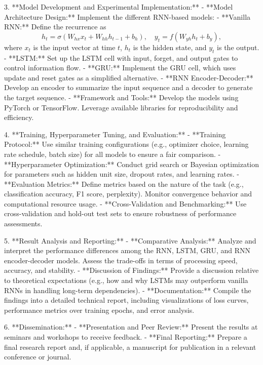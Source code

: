 \documentclass[12pt,a4paper]{article}
\begin{document}
3. **Model Development and Experimental Implementation:**
   - **Model Architecture Design:**  
     Implement the different RNN-based models:
     - **Vanilla RNN:**  
       Define the recurrence as  
       \[
       h_t = \sigma(W_{hx} x_t + W_{hh} h_{t-1} + b_h), \quad y_t = f(W_{yh} h_t + b_y),
       \]
       where \(x_t\) is the input vector at time \(t\), \(h_t\) is the hidden state, and \(y_t\) is the output.
     - **LSTM:**  
       Set up the LSTM cell with input, forget, and output gates to control information flow.
     - **GRU:**  
       Implement the GRU cell, which uses update and reset gates as a simplified alternative.
     - **RNN Encoder-Decoder:**  
       Develop an encoder to summarize the input sequence and a decoder to generate the target sequence.
   - **Framework and Tools:**  
     Develop the models using PyTorch or TensorFlow. Leverage available libraries for reproducibility and efficiency.

4. **Training, Hyperparameter Tuning, and Evaluation:**
   - **Training Protocol:**  
     Use similar training configurations (e.g., optimizer choice, learning rate schedule, batch size) for all models to ensure a fair comparison.
   - **Hyperparameter Optimization:**  
     Conduct grid search or Bayesian optimization for parameters such as hidden unit size, dropout rates, and learning rates.
   - **Evaluation Metrics:**  
     Define metrics based on the nature of the task (e.g., classification accuracy, F1 score, perplexity). Monitor convergence behavior and computational resource usage.
   - **Cross-Validation and Benchmarking:**  
     Use cross-validation and hold-out test sets to ensure robustness of performance assessments.

5. **Result Analysis and Reporting:**
   - **Comparative Analysis:**  
     Analyze and interpret the performance differences among the RNN, LSTM, GRU, and RNN encoder-decoder models. Assess the trade-offs in terms of processing speed, accuracy, and stability.
   - **Discussion of Findings:**  
     Provide a discussion relative to theoretical expectations (e.g., how and why LSTMs may outperform vanilla RNNs in handling long-term dependencies).
   - **Documentation:**  
     Compile the findings into a detailed technical report, including visualizations of loss curves, performance metrics over training epochs, and error analysis.

6. **Dissemination:**
   - **Presentation and Peer Review:**  
     Present the results at seminars and workshops to receive feedback.
   - **Final Reporting:**  
     Prepare a final research report and, if applicable, a manuscript for publication in a relevant conference or journal.





\printbibliography
\end{document}
